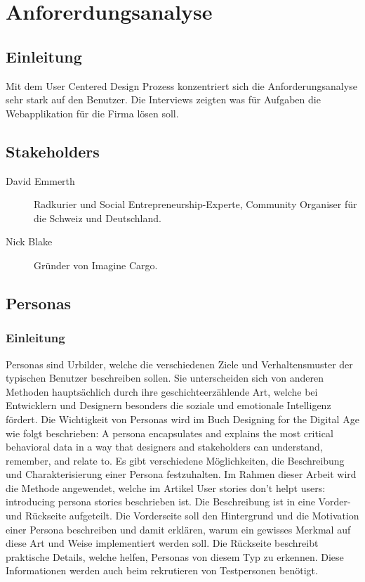 \chapter{Anforerdungsanalyse}
\label{sec:anforderungsanalyse}


\section{Einleitung}
Mit dem User Centered Design Prozess konzentriert sich die Anforderungsanalyse sehr stark auf den Benutzer. Die Interviews zeigten was für Aufgaben die Webapplikation für die Firma lösen soll.


\section{Stakeholders}
\begin{description}
	\item[David Emmerth] Radkurier und Social Entrepreneurship-Experte, Community Organiser für die Schweiz und Deutschland.
	\item[Nick Blake] Gründer von Imagine Cargo.
\end{description}

\section{Personas}
\label{sec:personas}

\subsection{Einleitung}
Personas sind Urbilder, welche die verschiedenen Ziele und Verhaltensmuster der typischen Benutzer beschreiben sollen. Sie unterscheiden sich von anderen Methoden hauptsächlich durch ihre geschichteerzählende Art, welche bei Entwicklern und Designern besonders die soziale und emotionale Intelligenz fördert. Die Wichtigkeit von Personas wird im Buch Designing for the Digital Age \citep[chapter 11]{goodwin2011designing} wie folgt beschrieben: \glqq A persona encapsulates and explains the most critical behavioral data in a way that designers and stakeholders can understand, remember, and relate to\grqq.
\newline{}
Es gibt verschiedene Möglichkeiten, die Beschreibung und Charakterisierung einer Persona festzuhalten. Im Rahmen dieser Arbeit wird die Methode angewendet, welche im Artikel \citep{interactions.acm2013online} \glqq User stories don't helpt users: introducing persona stories \grqq beschrieben ist. Die Beschreibung ist in eine Vorder- und Rückseite aufgeteilt. Die Vorderseite soll den Hintergrund und die Motivation einer Persona beschreiben und damit erklären, warum ein gewisses Merkmal auf diese Art und Weise implementiert werden soll. Die Rückseite beschreibt praktische Details, welche helfen, Personas von diesem Typ zu erkennen. Diese Informationen werden auch beim rekrutieren von Testpersonen benötigt.

